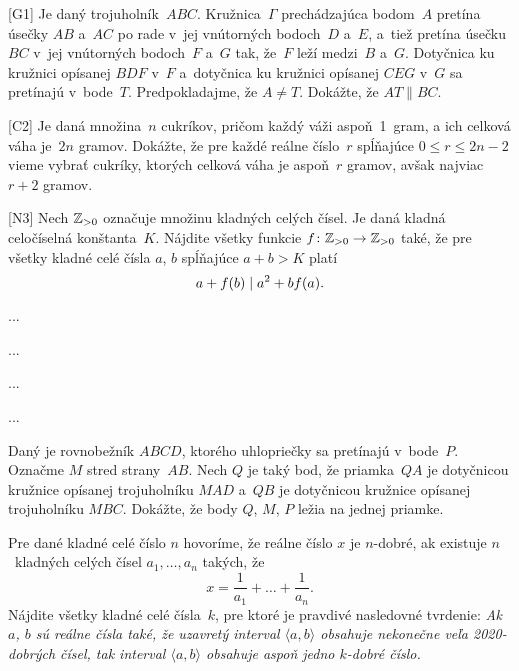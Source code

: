 {%
[G1] Je daný trojuholník~$ABC$. Kružnica~$\Gamma$ prechádzajúca bodom~$A$ pretína úsečky $AB$ a~$AC$ po rade v~jej vnútorných bodoch~$D$ a~$E$, a~tiež pretína úsečku $BC$ v~jej vnútorných bodoch~$F$ a~$G$ tak, že~$F$ leží medzi~$B$ a~$G$. Dotyčnica ku kružnici opísanej $BDF$ v~$F$ a~dotyčnica ku kružnici opísanej $CEG$ v~$G$ sa pretínajú v~bode~$T$. Predpokladajme, že $A \ne T$. Dokážte, že $AT \parallel BC$.}

{%
[C2] Je daná množina~$n$ cukríkov, pričom každý váži aspoň~1~gram, a ich celková váha je~$2n$ gramov. Dokážte, že pre každé reálne číslo~$r$ spĺňajúce $0 \leq r \leq 2n-2$ vieme vybrať cukríky, ktorých celková váha je aspoň~$r$ gramov, avšak najviac $r+2$ gramov.}

{%
[N3] Nech ${\Bbb Z}_{>0}$ označuje množinu kladných celých čísel. Je daná kladná celočíselná konštanta~$K$. Nájdite všetky funkcie $f\colon {\Bbb Z}_{>0} \rightarrow {\Bbb Z}_{>0}$ také, že pre všetky kladné celé čísla $a$, $b$ spĺňajúce $a+b>K$ platí
$$
\abovedisplayskip0pt
a+f(b) \mid a^2+bf(a).
\belowdisplayskip0pt
$$}

{%
...}

{%
...}

{%
...}

{%
...}

{%
Daný je rovnobežník $ABCD$, ktorého uhlopriečky sa pretínajú v~bode~$P$. Označme $M$ stred strany~$AB$. Nech $Q$ je taký bod, že priamka~$QA$ je dotyčnicou kružnice opísanej trojuholníku $MAD$ a~$QB$ je dotyčnicou kružnice opísanej trojuholníku $MBC$. Dokážte, že body $Q$, $M$, $P$ ležia na jednej priamke.}

{%
Pre dané kladné celé číslo $n$ hovoríme, že reálne číslo $x$ je $n$-dobré, ak existuje $n$~kladných celých čísel $a_1,\dots,a_n$ takých, že
$$
x= \frac1{a_1}+\dots+\frac1{a_n}.
$$
Nájdite všetky kladné celé čísla~$k$, pre ktoré je pravdivé nasledovné tvrdenie: {\it Ak $a$, $b$ sú reálne čísla také, že uzavretý interval $\langle a,b\rangle$ obsahuje nekonečne veľa 2020-dobrých čísel, tak interval $\langle a,b\rangle$ obsahuje aspoň jedno $k$-dobré číslo.}}

